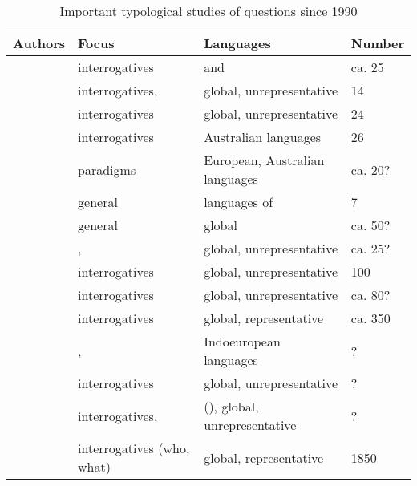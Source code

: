 \begin{table}
\caption{Important typological studies of questions since 1990}
\label{tab:4:1}
\footnotesize	
\begin{tabularx}{\textwidth}{Q@{~}Q@{~}Q@{~}l@{}}
\lsptoprule

\textbf{Authors} & \textbf{Focus} & \textbf{Languages} & Number\\
\midrule
\citealt{MuyskenSmith1990} & interrogatives &  and  & ca. 25\\
\citealt{Heine1991} & interrogatives,  & global, unrepresentative & 14\\
\citealt{Lindström1995} & interrogatives & global, unrepresentative & 24\\
\citealt{Mushin1995} & interrogatives & Australian languages & 26\\
\citealt{Nau1999} &  paradigms & European, Australian languages & ca. 20?\\
\citealt{Huang1999} & general & languages of  & 7\\
\citealt{Siemund2001} & general & global & ca. 50?\\
\citealt{Bencini2003} & ,  & global, unrepresentative & ca. 25?\\
\citealt{Diessel2003} & interrogatives & global, unrepresentative & 100\\
\citealt{Bhat2004} & interrogatives & global, unrepresentative & ca. 80?\\
\citealt{Idiatov2004} & interrogatives & global, representative & ca. 350\\
\citealt{Hackstein2004} & ,  & Indoeuropean languages & ?\\
\citealt{Cysouw2005} & interrogatives & global, unrepresentative & ?\\
\citealt{Cysouw2007} & interrogatives,  &  (),
global, unrepresentative & ?\\
\citealt{Idiatov2007} & interrogatives (who, what) & global, representative & 1850\\


\end{tabularx}
\end{table}
